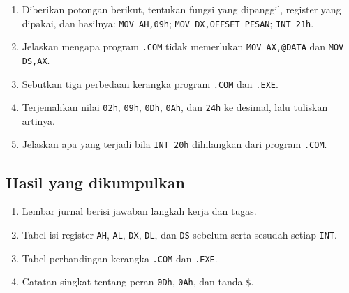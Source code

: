 \begin{enumerate}
    \item Diberikan potongan berikut, tentukan fungsi yang dipanggil,
          register yang dipakai, dan hasilnya:
          \texttt{MOV AH,09h}; \texttt{MOV DX,OFFSET PESAN};
          \texttt{INT 21h}.
    \item Jelaskan mengapa program \texttt{.COM} tidak memerlukan
          \texttt{MOV AX,@DATA} dan \texttt{MOV DS,AX}.
    \item Sebutkan tiga perbedaan kerangka program \texttt{.COM} dan
          \texttt{.EXE}.
    \item Terjemahkan nilai \texttt{02h}, \texttt{09h},
          \texttt{0Dh}, \texttt{0Ah}, dan \texttt{24h} ke desimal,
          lalu tuliskan artinya.
    \item Jelaskan apa yang terjadi bila \texttt{INT 20h} dihilangkan
          dari program \texttt{.COM}.
\end{enumerate}

\subsection{Hasil yang dikumpulkan}

\begin{enumerate}
    \item Lembar jurnal berisi jawaban langkah kerja dan tugas.
    \item Tabel isi register \texttt{AH}, \texttt{AL}, \texttt{DX},
          \texttt{DL}, dan \texttt{DS} sebelum serta sesudah setiap
          \texttt{INT}.
    \item Tabel perbandingan kerangka \texttt{.COM} dan \texttt{.EXE}.
    \item Catatan singkat tentang peran \texttt{0Dh}, \texttt{0Ah},
          dan tanda \texttt{\$}.
\end{enumerate}

